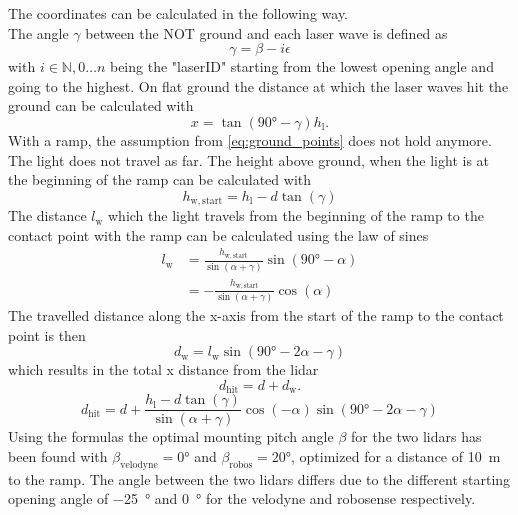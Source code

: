 The coordinates can be calculated in the following way.\\
The angle $\gamma$ between the NOT ground and each laser wave is defined as
\begin{equation}
	\gamma = \beta - i\epsilon
\end{equation}
with $i \in \mathbb{N}, 0\dots n$ being the "laserID" starting from the lowest opening angle and going to the highest.
On flat ground the distance at which the laser waves hit the ground can be calculated with
\begin{equation}
	x = \tan(\ang{90} - \gamma) h_\mathrm{l}.
	\label{eq:ground_points}
\end{equation}
With a ramp, the assumption from \cref{eq:ground_points} does not hold anymore.
The light does not travel as far.
The height above ground, when the light is at the beginning of the ramp can be calculated with
\begin{equation}
	h_\mathrm{w,start} = h_\mathrm{l} - d\tan(\gamma)
\end{equation}
The distance $l_\mathrm{w}$ which the light travels from the beginning of the ramp to the contact point with the ramp can be calculated using the law of sines
\begin{align}
	l_\mathrm{w} & = \frac{h_\mathrm{w,start} }{\sin(\alpha + \gamma)} \sin(\ang{90} - \alpha) \\
	             & = -\frac{h_\mathrm{w,start} }{\sin(\alpha + \gamma)} \cos(\alpha)
\end{align}
The travelled distance along the x-axis from the start of the ramp to the contact point is then
\begin{equation}
	d_\mathrm{w}  = l_\mathrm{w} \sin(\ang{90} - 2\alpha - \gamma)
\end{equation}
which results in the total x distance from the \gls{lidar}
\begin{equation}
	d_\mathrm{hit} = d + d_\mathrm{w}.
\end{equation}
\begin{equation}
	d_\mathrm{hit} = d + \frac{h_\mathrm{l} - d\tan(\gamma)}{\sin(\alpha + \gamma)} \cos(-\alpha) \sin(\ang{90} - 2\alpha - \gamma)
\end{equation}
Using the formulas the optimal mounting pitch angle $\beta$ for the two \gls{lidar}s has been found with $\beta_\mathrm{velodyne} = \ang{0}$ and $\beta_\mathrm{robos} = \ang{20}$, optimized for a distance of \SI{10}{\metre} to the ramp.
The angle between the two \gls{lidar}s differs due to the different starting opening angle of \SI{-25}{\degree} and \SI{0}{\degree} for the velodyne and robosense respectively.


